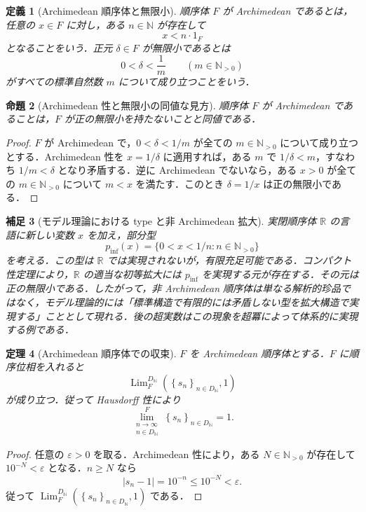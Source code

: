 \documentclass[a4paper,11pt]{ltjsarticle}
\theoremstyle{jpdef}
\newtheorem{definition}{定義}[section]
\newtheorem{remark}[definition]{補足}
\theoremstyle{jpthm}
\newtheorem{theorem}[definition]{定理}
\newtheorem{proposition}[definition]{命題}
\newcommand{\N}{\mathbb{N}}
\newcommand{\R}{\mathbb{R}}
\newcommand{\Lim}{\operatorname{Lim}}
\newcommand{\Ns}{\N_{>0}}
\newcommand{\DN}{D_{\N}}
\newcommand{\abs}[1]{\left\lvert#1\right\rvert}
\newcommand{\seq}[2]{\left\{#1\right\}_{#2}}
\newcommand{\eps}{\varepsilon}
\begin{document}
\begin{definition}[Archimedean 順序体と無限小]
順序体 \(F\) が Archimedean であるとは，任意の \(x\in F\) に対し，ある \(n\in\N\) が存在して
\[
  x<n\cdot1_F
\]
となることをいう．正元 \(\delta\in F\) が無限小であるとは
\[
  0<\delta<\frac1m\qquad(m\in\Ns)
\]
がすべての標準自然数 \(m\) について成り立つことをいう．
\end{definition}

\begin{proposition}[Archimedean 性と無限小の同値な見方]
順序体 \(F\) が Archimedean であることは，\(F\) が正の無限小を持たないことと同値である．
\end{proposition}

\begin{proof}
\(F\) が Archimedean で，\(0<\delta<1/m\) が全ての \(m\in\Ns\) について成り立つとする．Archimedean 性を \(x=1/\delta\) に適用すれば，ある \(m\) で \(1/\delta<m\)，すなわち \(1/m<\delta\) となり矛盾する．逆に Archimedean でないなら，ある \(x>0\) が全ての \(m\in\Ns\) について \(m<x\) を満たす．このとき \(\delta=1/x\) は正の無限小である．
\end{proof}


\begin{remark}[モデル理論における type と非 Archimedean 拡大]
実閉順序体 \(\R\) の言語に新しい変数 \(x\) を加え，部分型
\[
  p_{\inf}(x)=\{0<x<1/n:n\in\Ns\}
\]
を考える．この型は \(\R\) では実現されないが，有限充足可能である．コンパクト性定理により，\(\R\) の適当な初等拡大には \(p_{\inf}\) を実現する元が存在する．その元は正の無限小である．したがって，非 Archimedean 順序体は単なる解析的珍品ではなく，モデル理論的には「標準構造で有限的には矛盾しない型を拡大構造で実現する」こととして現れる．後の超実数はこの現象を超冪によって体系的に実現する例である．
\end{remark}

\begin{theorem}[Archimedean 順序体での収束]
\(F\) を Archimedean 順序体とする．\(F\) に順序位相を入れると
\[
  \Lim_F^{\DN}(\seq{s_n}{n\in\DN},1)
\]
が成り立つ．従って Hausdorff 性により
\[
  \lim_{\substack{n\to\infty\\ n\in\DN}}^{F}\seq{s_n}{n\in\DN}=1.
\]
\end{theorem}

\begin{proof}
任意の \(\eps>0\) を取る．Archimedean 性により，ある \(N\in\Ns\) が存在して \(10^{-N}<\eps\) となる．\(n\ge N\) なら
\[
  \abs{s_n-1}=10^{-n}\le10^{-N}<\eps.
\]
従って \(\Lim_F^{\DN}(\seq{s_n}{n\in\DN},1)\) である．
\end{proof}
\end{document}
